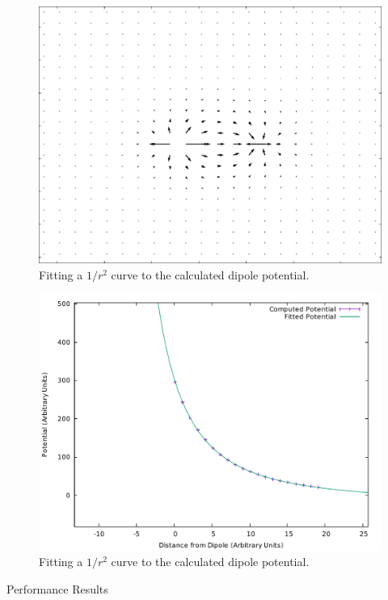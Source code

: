 	\begin{figure}[h]
	\centering
	\includegraphics[width=0.7\linewidth]{dipole_field.pdf}
	\caption{Fitting a $1/r^2$ curve to the calculated dipole potential.} \label{fig:dipolefit}
	\end{figure}


	\begin{figure}[h]
	\centering
	\includegraphics[width=\linewidth]{dipole_fit.pdf}
	\caption{Fitting a $1/r^2$ curve to the calculated dipole potential.} \label{fig:dipolefit}
	\end{figure}

	Performance Results

